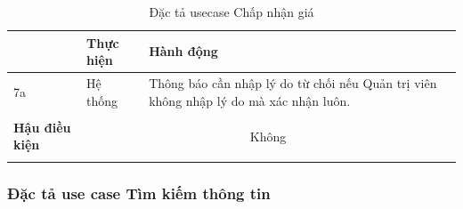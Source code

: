 \documentclass{article}
\begin{document}
\begin{longtable}{| p{} | p{} | p{} | p{} |}
{        \begin{tabular}{| p{} | p{} | p{} |} 
            \hline
                \bfseries STT & \bfseries Thực hiện &  \bfseries Hành động \\\hline
                7a & Hệ thống & Thông báo cần nhập lý do từ chối nếu Quản trị viên không nhập lý do mà xác nhận luôn. \\\hline
        \end{tabular}
        }\\\hline
        \bfseries Hậu điều kiện & \multicolumn{3}{c|}{Không}\\\hline
    \caption{Đặc tả usecase Chấp nhận giá}
    \label{bang24}
    \end{longtable}
\subsubsection{Đặc tả use case Tìm kiếm thông tin}
\end{document}
